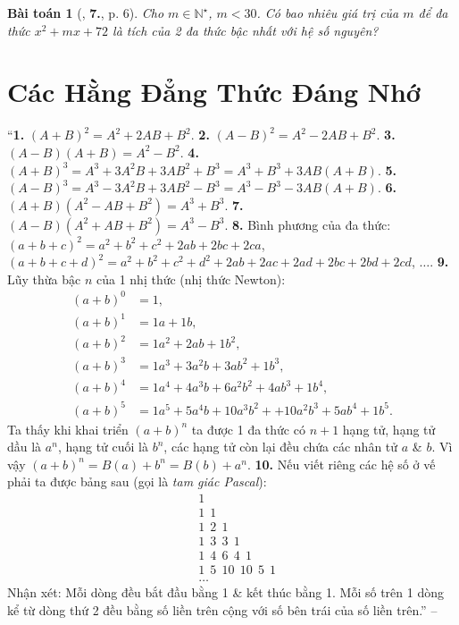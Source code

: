 \documentclass{article}
\numberwithin{equation}{section}
\newtheorem{baitoan}{Bài toán}[section]
\begin{document}
\begin{baitoan}[\cite{Tuyen_Toan_8}, \textbf{7.}, p. 6]
	Cho $m\in\mathbb{N}^\star$, $m < 30$. Có bao nhiêu giá trị của $m$ để đa thức $x^2 + mx + 72$ là tích của 2 đa thức bậc nhất với hệ số nguyên?
\end{baitoan}


\section{Các Hằng Đẳng Thức Đáng Nhớ}
``\textbf{1.} $(A + B)^2 = A^2 + 2AB + B^2$. \textbf{2.} $(A - B)^2 = A^2 - 2AB + B^2$. \textbf{3.} $(A - B)(A + B) = A^2 - B^2$. \textbf{4.} $(A + B)^3 = A^3 + 3A^2B + 3AB^2 + B^3 = A^3 + B^3 + 3AB(A + B)$. \textbf{5.} $(A - B)^3 = A^3 - 3A^2B + 3AB^2 - B^3 = A^3 - B^3 - 3AB(A + B)$. \textbf{6.} $(A + B)(A^2 - AB + B^2) = A^3 + B^3$. \textbf{7.} $(A - B)(A^2 + AB + B^2) = A^3 - B^3$. \textbf{8.} Bình phương của đa thức: $(a + b + c)^2 = a^2 + b^2 + c^2 + 2ab + 2bc + 2ca$, $(a + b + c + d)^2 = a^2 + b^2 + c^2 + d^2 + 2ab + 2ac + 2ad + 2bc + 2bd + 2cd$, $\ldots$. \textbf{9.} Lũy thừa bậc $n$ của 1 nhị thức (nhị thức Newton):
\begin{align*}
	(a + b)^0 &= 1,\\
	(a + b)^1 &= 1a + 1b,\\
	(a + b)^2 &= 1a^2 + 2ab + 1b^2,\\
	(a + b)^3 &= 1a^3 + 3a^2b + 3ab^2 + 1b^3,\\
	(a + b)^4 &= 1a^4 + 4a^3b + 6a^2b^2 + 4ab^3 + 1b^4,\\
	(a + b)^5 &= 1a^5 + 5a^4b + 10a^3b^2 + + 10a^2b^3 + 5ab^4 + 1b^5.
\end{align*}
Ta thấy khi khai triển $(a + b)^n$ ta được 1 đa thức có $n + 1$ hạng tử, hạng tử dầu là $a^n$, hạng tử cuối là $b^n$, các hạng tử còn lại đều chứa các nhân tử $a$ \& $b$. Vì vậy $(a + b)^n = B(a) + b^n = B(b) + a^n$. \textbf{10.} Nếu viết riêng các hệ số ở vế phải ta được bảng sau (gọi là \textit{tam giác Pascal}):
\begin{align*}
	&1\\
	&1\ \ 1\\
	&1\ \ 2\ \ 1\\
	&1\ \ 3\ \ 3\ \ 1\\
	&1\ \ 4\ \ 6\ \ 4\ \ 1\\
	&1\ \ 5\ \ 10\ \ 10\ \ 5\ \ 1\\
	&\ldots
\end{align*}
Nhận xét: Mỗi dòng đều bắt đầu bằng 1 \& kết thúc bằng 1. Mỗi số trên 1 dòng kể từ dòng thứ 2 đều bằng số liền trên cộng với số bên trái của số liền trên.'' -- \cite[\S2, pp. 6--7]{Tuyen_Toan_8}
\end{document}
